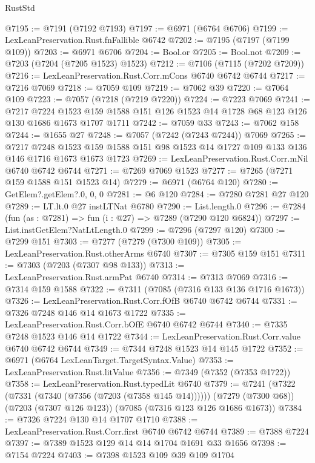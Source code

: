 \begin{lexlean}{RustStd}
\begin{coremodule}
{\begin{coremodule}
{{{{{{{{{{{{{{{{{{{{{{{{{{{{{{{{{{{{{{{{{{{{@7195 := @7191 (@7192 @7193)
@7197 := @6971 (@6764 @6706)
@7199 := LexLeanPreservation.Rust.fnFallible @6742
@7202 := @7195 (@7197 (@7199 @109))
@7203 := @6971 @6706
@7204 := Bool.or
@7205 := Bool.not
@7209 := @7203 (@7204 (@7205 @1523) @1523)
@7212 := @7106 (@7115 (@7202 @7209))
@7216 := LexLeanPreservation.Rust.Corr.mCons @6740 @6742 @6744
@7217 := @7216 @7069
@7218 := @7059 @109
@7219 := @7062 @39
@7220 := @7064 @109
@7223 := @7057 (@7218 (@7219 @7220))
@7224 := @7223 @7069
@7241 := @7217
    @7224
    @1523
    @159
    @1588
    @151
    @126
    @1523
    @14
    @1728
    @68
    @123
    @126
    @130
    @1686
    @1673
    @1707
    @1711
@7242 := @7059 @33
@7243 := @7062 @158
@7244 := @1655 @27
@7248 := @7057 (@7242 (@7243 @7244)) @7069
@7265 := @7217
    @7248
    @1523
    @159
    @1588
    @151
    @98
    @1523
    @14
    @1727
    @109
    @133
    @136
    @146
    @1716
    @1673
    @1673
    @1723
@7269 := LexLeanPreservation.Rust.Corr.mNil @6740 @6742 @6744
@7271 := @7269 @7069 @1523
@7277 := @7265 (@7271 @159 @1588 @151 @1523 @14)
@7279 := @6971 (@6764 @120)
@7280 := GetElem?.getElem?.{0, 0, 0}
@7281 := @6 @120
@7284 := @7280 @7281 @27 @120
@7289 := LT.lt.{0} @27 instLTNat @6780
@7290 := List.length.{0}
@7296 := @7284 (fun (as : @7281) => fun (i : @27) => @7289 (@7290 @120 @6824))
@7297 := List.instGetElem?NatLtLength.{0}
@7299 := @7296 (@7297 @120)
@7300 := @7299 @151
@7303 := @7277 (@7279 (@7300 @109))
@7305 := LexLeanPreservation.Rust.otherArms @6740
@7307 := @7305 @159 @151
@7311 := @7303 (@7203 (@7307 @98 @133))
@7313 := LexLeanPreservation.Rust.armPat @6740
@7314 := @7313 @7069
@7316 := @7314 @159 @1588
@7322 := @7311 (@7085 (@7316 @133 @136 @1716 @1673))
@7326 := LexLeanPreservation.Rust.Corr.fOfB @6740 @6742 @6744
@7331 := @7326 @7248 @146 @14 @1673 @1722
@7335 := LexLeanPreservation.Rust.Corr.bOfE @6740 @6742 @6744
@7340 := @7335 @7248 @1523 @146 @14 @1722
@7344 := LexLeanPreservation.Rust.Corr.value @6740 @6742 @6744
@7349 := @7344 @7248 @1523 @14 @145 @1722
@7352 := @6971 (@6764 LexLeanTarget.TargetSyntax.Value)
@7353 := LexLeanPreservation.Rust.litValue
@7356 := @7349 (@7352 (@7353 @1722))
@7358 := LexLeanPreservation.Rust.typedLit @6740
@7379 := @7241
    (@7322 (@7331 (@7340 (@7356 (@7203 (@7358 @145 @14))))))
    (@7279 (@7300 @68))
    (@7203 (@7307 @126 @123))
    (@7085 (@7316 @123 @126 @1686 @1673))
@7384 := @7326 @7224 @130 @14 @1707 @1710
@7388 := LexLeanPreservation.Rust.Corr.first @6740 @6742 @6744
@7389 := @7388 @7224
@7397 := @7389 @1523 @129 @14 @14 @1704 @1691 @33 @1656
@7398 := @7154 @7224
@7403 := @7398 @1523 @109 @39 @109 @1704
}}}}}}}}}}}}}}}}}}}}}}}}}}}}}}}}}}}}}}}}}}}}
\end{coremodule}}
\end{coremodule}
\end{lexlean}

